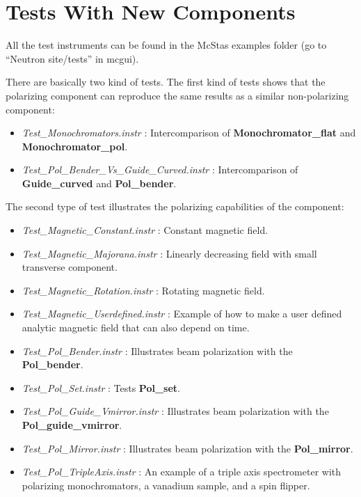 \section{Tests With New Components}
\label{sec:test}

All the test instruments can be found in the McStas examples folder
(go to ``Neutron site/tests'' in mcgui).

There are basically two kind of tests. The first kind of tests shows
that the polarizing component can reproduce the same results as a
similar non-polarizing component:
\begin{itemize}
\item \textit{Test\_Monochromators.instr} : Intercomparison of
  \textbf{Monochromator\_flat} and \textbf{Monochromator\_pol}.
\item \textit{Test\_Pol\_Bender\_Vs\_Guide\_Curved.instr} : Intercomparison of
  \textbf{Guide\_curved} and \textbf{Pol\_bender}.
\end{itemize}

The second type of test illustrates the polarizing capabilities of the
component:
\begin{itemize}
\item \textit{Test\_Magnetic\_Constant.instr} : Constant magnetic field.
\item \textit{Test\_Magnetic\_Majorana.instr} : Linearly decreasing field with
  small transverse component.
\item \textit{Test\_Magnetic\_Rotation.instr} : Rotating magnetic field.
\item \textit{Test\_Magnetic\_Userdefined.instr} : Example of how to make a
  user defined analytic magnetic field that can also depend on time.
\item \textit{Test\_Pol\_Bender.instr} : Illustrates beam polarization with
  the \textbf{Pol\_bender}.
\item \textit{Test\_Pol\_Set.instr} : Tests \textbf{Pol\_set}.
\item \textit{Test\_Pol\_Guide\_Vmirror.instr} : Illustrates beam polarization
  with the \textbf{Pol\_guide\_vmirror}.
\item \textit{Test\_Pol\_Mirror.instr} : Illustrates beam polarization
  with the \textbf{Pol\_mirror}.
\item \textit{Test\_Pol\_TripleAxis.instr} : An example of a triple axis
  spectrometer with polarizing monochromators, a vanadium sample, and a spin
  flipper.
\end{itemize}

